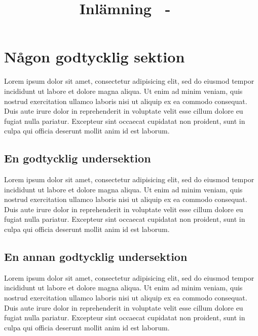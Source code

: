 \documentclass[a4paper,10pt,twoside]{article}
\title{Inlämning \homeworknumber\ - \course\ \coursename}
\date{\thedate}
\author{\theauthor}
\begin{document}

\clearpage
\thispagestyle{empty}
\mbox{} %
\clearpage 

\setcounter{page}{1}

\section{Någon godtycklig sektion}
\label{sec:någon_godtycklig_sektion}
Lorem ipsum dolor sit amet, consectetur adipisicing elit, sed do eiusmod tempor incididunt ut labore et dolore magna aliqua. Ut enim ad minim veniam, quis nostrud exercitation ullamco laboris nisi ut aliquip ex ea commodo consequat. Duis aute irure dolor in reprehenderit in voluptate velit esse cillum dolore eu fugiat nulla pariatur. Excepteur sint occaecat cupidatat non proident, sunt in culpa qui officia deserunt mollit anim id est laborum.

\subsection{En godtycklig undersektion}
\label{sub:en_godtycklig_undersektion}
Lorem ipsum dolor sit amet, consectetur adipisicing elit, sed do eiusmod tempor incididunt ut labore et dolore magna aliqua. Ut enim ad minim veniam, quis nostrud exercitation ullamco laboris nisi ut aliquip ex ea commodo consequat. Duis aute irure dolor in reprehenderit in voluptate velit esse cillum dolore eu fugiat nulla pariatur. Excepteur sint occaecat cupidatat non proident, sunt in culpa qui officia deserunt mollit anim id est laborum.

\subsection{En annan godtycklig undersektion}
\label{sub:en_annan_godtycklig_undersektion}
Lorem ipsum dolor sit amet, consectetur adipisicing elit, sed do eiusmod tempor incididunt ut labore et dolore magna aliqua. Ut enim ad minim veniam, quis nostrud exercitation ullamco laboris nisi ut aliquip ex ea commodo consequat. Duis aute irure dolor in reprehenderit in voluptate velit esse cillum dolore eu fugiat nulla pariatur. Excepteur sint occaecat cupidatat non proident, sunt in culpa qui officia deserunt mollit anim id est laborum.
\end{document}
